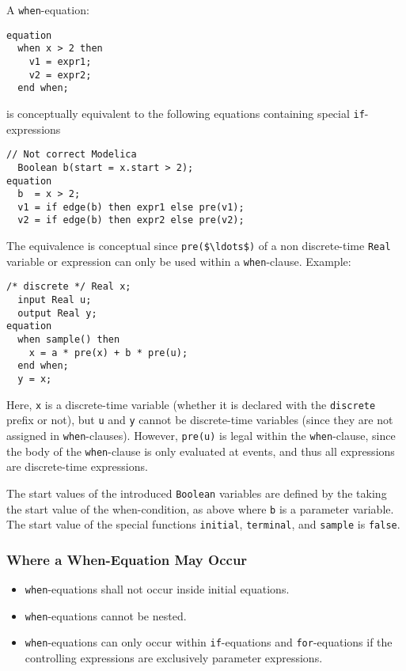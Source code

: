 A \lstinline!when!-equation:
\begin{lstlisting}[language=modelica]
equation
  when x > 2 then
    v1 = expr1;
    v2 = expr2;
  end when;
\end{lstlisting}
is conceptually equivalent to the following equations containing special \lstinline!if!-expressions
\begin{lstlisting}[language=modelica]
  // Not correct Modelica
  Boolean b(start = x.start > 2);
equation
  b  = x > 2;
  v1 = if edge(b) then expr1 else pre(v1);
  v2 = if edge(b) then expr2 else pre(v2);
\end{lstlisting}

\begin{nonnormative}
The equivalence is conceptual since \lstinline!pre($\ldots$)! of a non discrete-time \lstinline!Real! variable or expression can only be used within a \lstinline!when!-clause.
Example:
\begin{lstlisting}[language=modelica]
  /* discrete */ Real x;
  input Real u;
  output Real y;
equation
  when sample() then
    x = a * pre(x) + b * pre(u);
  end when;
  y = x;
\end{lstlisting}

Here, \lstinline!x! is a discrete-time variable (whether it is declared with the \lstinline!discrete! prefix or not), but \lstinline!u! and \lstinline!y! cannot be discrete-time variables
(since they are not assigned in \lstinline!when!-clauses).
However, \lstinline!pre(u)! is legal within the \lstinline!when!-clause, since the body of the \lstinline!when!-clause is only evaluated at events, and thus all expressions are discrete-time expressions.
\end{nonnormative}

The start values of the introduced \lstinline!Boolean! variables are defined by the taking the start value of the when-condition, as above where \lstinline!b! is a parameter variable.
The start value of the special functions \lstinline!initial!, \lstinline!terminal!, and \lstinline!sample! is \lstinline!false!.

\subsubsection{Where a When-Equation May Occur}\label{restrictions-on-where-a-when-equation-may-occur}\label{where-a-when-equation-may-occur}

\begin{itemize}
\item
  \lstinline!when!-equations shall not occur inside initial equations.
\item
  \lstinline!when!-equations cannot be nested.
\item
  \lstinline!when!-equations can only occur within \lstinline!if!-equations and \lstinline!for!-equations if the controlling expressions are exclusively parameter expressions.
\end{itemize}

